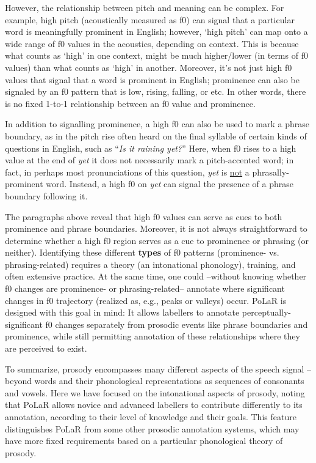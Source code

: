 \documentclass[11pt, twoside]{memoir}
\def\langtext#1{\textit{#1}}
\begin{document}
However, the relationship between pitch and meaning can be complex. For example, high pitch (acoustically measured as f0) can signal that a particular word is meaningfully prominent in English; however, ‘high pitch’ can map onto a wide range of f0 values in the acoustics, depending on context. This is because what counts as ‘high’ in one context, might be much higher\slash lower (in terms of f0 values) than what counts as ‘high’ in another. Moreover, it’s not just high f0 values that signal that a word is prominent in English; prominence can also be signaled by an f0 pattern that is low, rising, falling, or etc. In other words, there is no fixed 1-to-1 relationship between an f0 value and prominence.

In addition to signalling prominence, a high f0 can also be used to mark a phrase boundary, as in the pitch rise often heard on the final syllable of certain kinds of questions in English, such as “\langtext{Is it raining yet?}” Here, when f0 rises to a high value at the end of \langtext{yet} it does not necessarily mark a pitch-accented word; in fact, in perhaps most pronunciations of this question, \langtext{yet} is \uline{not} a phrasally-prominent word. Instead, a high f0 on \langtext{yet} can signal the presence of a phrase boundary following it.

The paragraphs above reveal that high f0 values can serve as cues to both prominence and phrase boundaries. Moreover, it is not always straightforward to determine whether a high f0 region serves as a cue to prominence or phrasing (or neither). Identifying these different \textbf{types} of f0 patterns (prominence- vs. phrasing-related) requires a theory (an intonational phonology), training, and often extensive practice. At the same time, one could --without knowing whether f0 changes are prominence- or phrasing-related-- annotate where significant changes in f0 trajectory (realized as, e.g., peaks or valleys) occur. PoLaR is designed with this goal in mind: It allows labellers to annotate perceptually-significant f0 changes separately from prosodic events like phrase boundaries and prominence, while still permitting annotation of these relationships where they are perceived to exist.

To summarize, prosody encompasses many different aspects of the speech signal -- beyond words and their phonological representations as sequences of consonants and vowels. Here we have focused on the intonational aspects of prosody, noting that PoLaR allows novice and advanced labellers to contribute differently to its annotation, according to their level of knowledge and their goals. This feature distinguishes PoLaR from some other prosodic annotation systems, which may have more fixed requirements based on a particular phonological theory of prosody.
\end{document}

